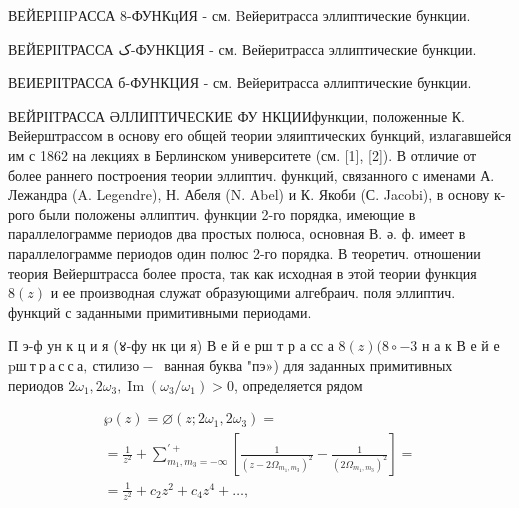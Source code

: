 \documentclass[10pt]{article}
\begin{document}
ВЕЙЕРIIIPАССА 8-ФУНКцИЯ - см. Bейеритрасса эллиптические бункции.



ВЕЙЕРІІТРАССА ک-ФУНКЦИЯ - см. Вейеритрасса эллиптические бункции.



ВЕИЕРІІТРАССА б-ФУНКЦИЯ - см. Вейеритрасса әллиптические бункции.



ВЕЙРІІТРАССА ӘЛЛИПТИЧЕСКИЕ ФУ НКЦИИфункции, положенные К. Вейерштрассом в основу его общей теории эляиптических бункций, излагавшейся им с 1862 на лекциях в Берлинском университете (см. [1], [2]). В отличие от более раннего построения теории эллиптич. функций, связанного с именами А. Лежандра (A. Legendre), Н. Абеля (N. Abel) и К. Якоби (С. Jacobi), в основу к-рого были положены әллиптич. функции 2-го порядка, имеющие в параллелограмме периодов два простых полюса, основная В. ә. ф. имеет в параллелограмме периодов один полюс 2-го порядка. В теоретич. отношении теория Вейерштрасса более проста, так как исходная в этой теории функция $8(z)$ и ее производная служат образующими алгебраич. поля эллиптич. функций с заданными примитивными периодами.



П э-ф ун к ц и я (४-фу нк ци я) В е й е рш т р а сс а $8(z)(8 \circ-3$ н а к В е й е $\mathrm{p} ш \mathbf{~ т ~ р ~ а ~ с ~ с ~ а , ~ с т и л и з о - ~}$ ванная буква "пэ») для заданных примитивных периодов $2 \omega_{1}, 2 \omega_{3}, \operatorname{Im}\left(\omega_{3} / \omega_{1}\right)>0$, определяется рядом



\[

\begin{gathered}

\wp(z)=\varnothing\left(z ; 2 \omega_{1}, 2 \omega_{3}\right)= \\

=\frac{1}{z^{2}}+\sum_{m_{1}, m_{3}=-\infty}^{\prime+}\left[\frac{1}{\left(z-2 \Omega_{m_{1}, m_{3}}\right)^{2}}-\frac{1}{\left(2 \Omega_{m_{1}, m_{3}}\right)^{2}}\right]= \\

=\frac{1}{z^{2}}+c_{2} z^{2}+c_{4} z^{4}+\ldots,

\end{gathered}

\]
\end{document}
